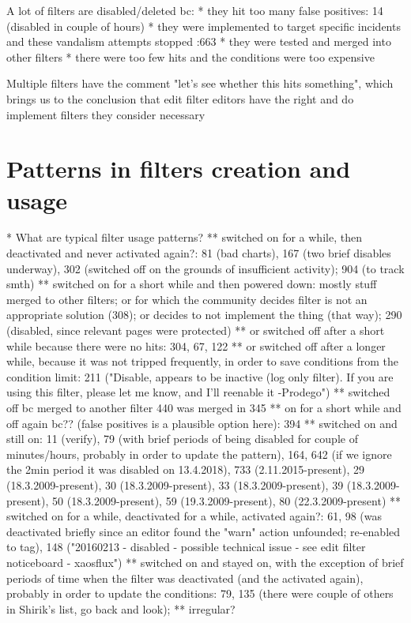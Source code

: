 A lot of filters are disabled/deleted bc:
* they hit too many false positives: 14 (disabled in couple of hours)
* they were implemented to target specific incidents and these vandalism attempts stopped :663
* they were tested and merged into other filters
* there were too few hits and the conditions were too expensive

Multiple filters have the comment "let's see whether this hits something", which brings us to the conclusion that edit filter editors have the right and do implement filters they consider necessary



\section{Patterns in filters creation and usage}
* What are typical filter usage patterns?
  ** switched on for a while, then deactivated and never activated again?: 81 (bad charts), 167 (two brief disables underway), 302 (switched off on the grounds of insufficient activity); 904 (to track smth)
     ** switched on for a short while and then powered down: mostly stuff merged to other filters; or for which the community decides filter is not an appropriate solution (308); or decides to not implement the thing (that way); 290 (disabled, since relevant pages were protected)
     ** or switched off after a short while because there were no hits: 304, 67, 122
     ** or switched off after a longer while, because it was not tripped frequently, in order to save conditions from the condition limit: 211 ("Disable, appears to be inactive (log only filter). If you are using this filter, please let me know, and I'll reenable it -Prodego")
     ** switched off bc merged to another filter 440 was merged in 345
     ** on for a short while and off again bc?? (false positives is a plausible option here): 394
  ** switched on and still on: 11 (verify), 79 (with brief periods of being disabled for couple of minutes/hours, probably in order to update the pattern), 164, 642 (if we ignore the 2min period it was disabled on 13.4.2018), 733 (2.11.2015-present), 29 (18.3.2009-present), 30 (18.3.2009-present), 33 (18.3.2009-present), 39 (18.3.2009-present), 50 (18.3.2009-present), 59 (19.3.2009-present), 80 (22.3.2009-present)
  ** switched on for a while, deactivated for a while, activated again?: 61, 98 (was deactivated briefly since an editor found the "warn" action unfounded; re-enabled to tag), 148 ("20160213 - disabled - possible technical issue - see edit filter noticeboard - xaosflux")
  ** switched on and stayed on, with the exception of brief periods of time when the filter was deactivated (and the activated again), probably in order to update the conditions: 79, 135 (there were couple of others in Shirik's list, go back and look);
  ** irregular?


